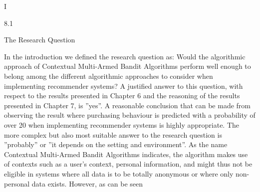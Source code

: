 I

8.1

The Research Question

In the introduction we defined the research question as:
Would the algorithmic approach of Contextual Multi-Armed Bandit Algorithms perform
well enough to belong among the different algorithmic approaches to consider when implementing recommender systems?
A justified answer to this question, with respect to the results presented in Chapter 6 and
the reasoning of the results presented in Chapter 7, is ”yes”. A reasonable conclusion that
can be made from observing the result where purchasing behaviour is predicted with a
probability of over 20 %
when implementing recommender systems is highly appropriate.
The more complex but also most suitable answer to the research question is ”probably”
or ”it depends on the setting and environment”. As the name Contextual Multi-Armed
Bandit Algorithms indicates, the algorithm makes use of contexts such as a user’s context, personal information, and might thus not be eligible in systems where all data is to
be totally anonymous or where only non-personal data exists. However, as can be seen

